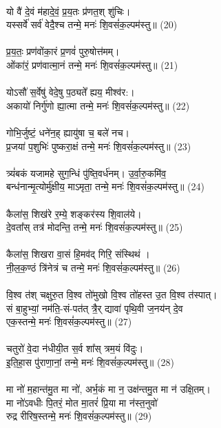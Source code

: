 \\
यो वै॑ दे॒वं म॑हादे॒वं॒ प्र॒य॒तः प्र॑णत॒श् शु॑चिः। \\
यस्सर्वे॑ सर्व॑ वेदै॒श्च तन्मे॒ मनः॑ शि॒वसं॑क॒ल्पम॑स्तु॥ (20)\\
 \\
प्र॒य॒तः॒ प्रण॑वोंका॒रं प्र॒णवं॑ पुरु॒षोत्त॑मम्। \\
ओंका॑रं॒ प्रण॑वात्मा॒नं तन्मे॒ मनः॑ शि॒वसं॑क॒ल्पम॑स्तु॥ (21)\\
 \\
योऽसौ॑ स॒र्वेषु॑ वेदे॒षु प॒ठ्यते᳚ ह्यय॒ मीश्व॑र:। \\
अकायो॑ निर्गु॑णो ह्या॒त्मा तन्मे॒ मनः॑ शि॒वसं॑क॒ल्पम॑स्तु॥ (22)\\
\\
गोभि॒र्जुष्टं॒ धने॑न॒ह् ह्यायु॑षा च॒ बले॑ नच। \\
प्र॒जया॑ प॒शुभिः॑ पुष्करा॒क्षं तन्मे॒ मनः॑ शि॒वसं॑क॒ल्पम॑स्तु॥ (23)\\
  \\
त्र्यं॑बकं यजामहे सुग॒न्धिं पु॑ष्ति॒वर्ध॑नम्। उ॒र्वा॒रु॒कमि॑व॒ \\
बन्ध॑नान्मृ॒त्योर्मु॑क्षीय॒ माऽमृता॒ तन्मे॒ मनः॑ शि॒वसं॑क॒ल्पम॑स्तु॥ (24)\\
\\
कैला॑स॒ शिख॑रे र॒म्ये॒ शङ्कर॑स्य शि॒वाल॑ये। \\
दे॒वता᳚स् तत्र॑ मोदन्ति॒ तन्मे॒ मनः॑ शि॒वसं॑क॒ल्पम॑स्तु॥ (25)\\
\\
कैला॑स॒ शिखरा वा॒सं हि॒मव॑द् गिरि॒ संस्थिथं । \\
नी॒ल॒क॒ण्ठं त्रि॑नेत्रं च तन्मे॒ मनः॑ शि॒वसं॑क॒ल्पम॑स्तु॥ (26)\\
\\
वि॒श्व त॑श् चक्षुरु॒त वि॒श्व तो॑मुखो वि॒श्व तो॑हस्त उ॒त वि॒श्व त॑स्पात्।\\
सं बा॒हुभ्यां॒ नम॑ति॒-सं-पत॑त् त्रै॒र् द्यावा॑ पृथि॒वी ज॒नय॑न् दे॒व\\
 एक॒स्तन्मे॒ मनः॑ शि॒वसं॑क॒ल्पम॑स्तु॥ (27)\\
\\
चतुरो॑ वे॒दा न॑धीयी॒त स॒र्व शा᳚स् त्रम॒यं वि॑दुः।  \\
इ॒ति॒हा॒स पु॑राणा॒नां॒ तन्मे॒ मनः॑ शि॒वसं॑क॒ल्पम॑स्तु॥ (28)\\
\\
मा नो॑ म॒हान्त॑मु॒त मा नो॑, अर्भ॒कं मा न॒ उक्ष॑न्तमु॒त मा न॑ उक्षि॒तम्। \\
मा नो॑ऽवधीः पि॒तरं॒ मोत मा॒तरं॑ प्रि॒या मा न॑स्त॒नुवो॑ \\
रुद्र रीरिष॒स्तन्मे॒ मनः॑ शि॒वसं॑क॒ल्पम॑स्तु॥  (29)\\
